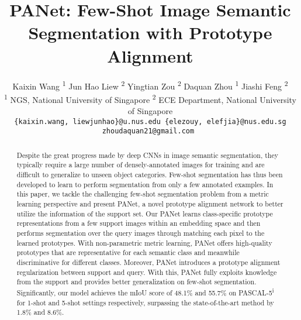 \documentclass[10pt,twocolumn,letterpaper]{article}
\begin{document}
\setlength{\abovedisplayskip}{4pt}
\setlength{\belowdisplayskip}{4pt}

\title{PANet: Few-Shot Image Semantic Segmentation with Prototype Alignment}

\author{Kaixin Wang \textsuperscript{1} \qquad Jun Hao Liew \textsuperscript{2} \qquad Yingtian Zou \textsuperscript{2} \qquad Daquan Zhou \textsuperscript{1} \qquad  Jiashi Feng \textsuperscript{2}   \\
\textsuperscript{1} NGS, National University of Singapore \quad \textsuperscript{2} ECE Department, National University of Singapore\\
{\tt\small \{kaixin.wang, liewjunhao\}@u.nus.edu  \quad \{elezouy, elefjia\}@nus.edu.sg \quad zhoudaquan21@gmail.com
}
}

\maketitle
\ificcvfinal\thispagestyle{empty}\fi

\begin{abstract}
   Despite the great progress made by deep CNNs in image semantic segmentation, they  typically require a large number of densely-annotated images for training and are difficult to generalize to unseen object categories. Few-shot segmentation has thus been developed to learn to perform segmentation from only a few annotated examples. In this paper, we tackle the challenging few-shot segmentation problem from a metric learning perspective and present PANet, a novel prototype alignment network to better utilize the information of the support set. Our PANet learns class-specific prototype representations from a few support images within an embedding space and then performs segmentation over the query images through matching each pixel to the learned prototypes. With non-parametric metric learning, PANet offers high-quality prototypes that are representative for each semantic class and meanwhile discriminative for different classes. Moreover, PANet introduces a prototype alignment regularization between support and query. With this, PANet fully exploits knowledge from the support and provides better generalization on few-shot segmentation. Significantly, our model achieves the mIoU score of 48.1\% and 55.7\% on PASCAL-5\textsuperscript{i} for 1-shot and 5-shot settings respectively, surpassing the state-of-the-art method by 1.8\% and 8.6\%.
\end{abstract}

\vspace{-4mm}
\end{document}
